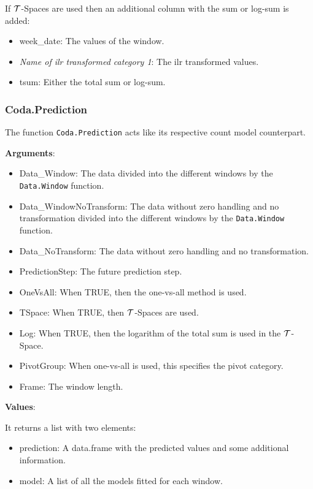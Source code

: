 If $\mathcal{T}$-Spaces are used then an additional column with the sum or log-sum is added:

\begin{itemize}
	\item week\_date: The values of the window.
	\item \textit{Name of ilr transformed category 1}: The ilr transformed values.
	\item tsum: Either the total sum or log-sum. 
\end{itemize}

\subsubsection{Coda.Prediction}
\label{sec:Coda.Prediction}

The function \texttt{Coda.Prediction} acts like its respective count model counterpart.

\textbf{Arguments}:

\begin{itemize}
	\item Data\_Window: The data divided into the different windows by the \texttt{Data.Window} function.
	\item Data\_WindowNoTransform: The data without zero handling and no transformation divided into the different windows by the \texttt{Data.Window} function.
	\item Data\_NoTransform: The data without zero handling and no transformation.
	\item PredictionStep: The future prediction step.
	\item OneVsAll: When TRUE, then the one-vs-all method is used.
	\item TSpace: When TRUE, then $\mathcal{T}$-Spaces are used.
	\item Log: When TRUE, then the logarithm of the total sum is used in the $\mathcal{T}$-Space.
	\item PivotGroup: When one-vs-all is used, this specifies the pivot category.
	\item Frame: The window length.
\end{itemize}

\textbf{Values}:

It returns a list with two elements:

\begin{itemize}
	\item prediction: A data.frame with the predicted values and some additional information.
	\item model: A list of all the models fitted for each window. 
\end{itemize}

